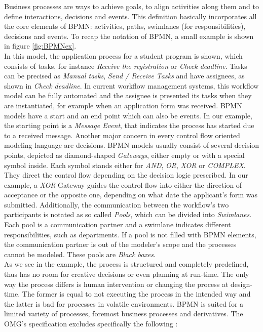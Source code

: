 Business processes are ways to achieve goals, to align activities along them and to define interactions, decisions and events. This definition basically incorporates all the core elements of BPMN: activities, paths, swimlanes (for responsibilities), decisions and events. To recap the notation of BPMN, a small example is shown in figure \ref{fig:BPMNex}. \\
In this model, the application process for a student program is shown, which consists of tasks, for instance \textit{Receive the registration} or \textit{Check deadline}. Tasks can be precised as \textit{Manual tasks}, \textit{Send / Receive Tasks} and have assignees, as shown in \textit{Check deadline}. In current workflow management systems, this workflow model can be fully automated and the assignee is presented its tasks when they are instantiated, for example when an application form was received. BPMN models have a start and an end point which can also be events. \newpage
In our example, the starting point is a \textit{Message Event}, that indicates the process has started due to a received message. 
Another major concern in every control flow oriented modeling language are decisions. BPMN models usually consist of several decision points, depicted as diamond-shaped \textit{Gateways}, either empty or with a special symbol inside. Each symbol stands either for \textit{AND}, \textit{OR}, \textit{XOR} or \textit{COMPLEX}. They direct the control flow depending on the decision logic prescribed. In our example, a \textit{XOR} Gateway guides the control flow into either the direction of acceptance or the opposite one, depending on what date the applicant's form was submitted. Additionally, the communication between the workflow's two participants is notated as so called \textit{Pools}, which can be divided into \textit{Swimlanes}. Each pool is a communication partner and a swimlane indicates different responsibilities, such as departments. If a pool is not filled with BPMN elements, the communication partner is out of the modeler's scope and the processes cannot be modeled. These pools are \textit{Black boxes}. \\
As we see in the example, the process is structured and completely predefined, thus has no room for creative decisions or even planning at run-time. The only way the process differs is human intervention or changing the process at design-time. The former is equal to not executing the process in the intended way and the latter is bad for processes in volatile environments. BPMN is suited for a limited variety of processes, foremost business processes and derivatives. The OMG's specification excludes specifically the following \cite{BPMNspec}: 

